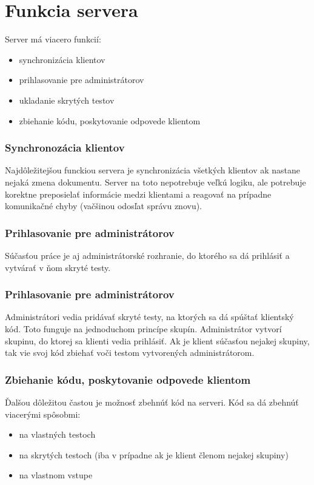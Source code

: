 \chapter{Funkcia servera}

\label{kap:server} %

Server má viacero funkcií:
\begin{itemize}
\item synchronizácia klientov
\item prihlasovanie pre administrátorov
\item ukladanie skrytých testov
\item zbiehanie kódu, poskytovanie odpovede klientom
\end{itemize}


\subsection{Synchronozácia klientov}
Najdôležitejšou funckiou servera je synchronizácia všetkých klientov ak nastane nejaká zmena
dokumentu. Server na toto nepotrebuje veľkú logiku, ale potrebuje korektne preposielať informácie
medzi klientami a reagovať na prípadne komunikačné chyby (vačšinou odosľat správu znovu).


\subsection{Prihlasovanie pre administrátorov}
Súčasťou práce je aj administrátorské rozhranie, do ktorého sa dá prihlásiť a vytvárať v ňom
skryté testy.

\subsection{Prihlasovanie pre administrátorov}
Administrátori vedia pridávať skryté testy, na ktorých
sa dá spúštať klientský kód. Toto funguje na jednoduchom princípe skupín. Administrátor vytvorí 
skupinu, do ktorej sa klienti vedia prihlásiť. Ak je klient súčasťou nejakej skupiny, tak vie svoj
kód zbiehať voči testom vytvorených administrátorom.

\subsection{Zbiehanie kódu, poskytovanie odpovede klientom}
Ďalšou dôležitou častou je možnosť zbehnúť kód na serveri. Kód sa dá zbehnúť viacerými spôsobmi:
\begin{itemize}
\item na vlastných testoch
\item na skrytých testoch (iba v prípadne ak je klient členom nejakej skupiny)
\item na vlastnom vstupe
\end{itemize}
